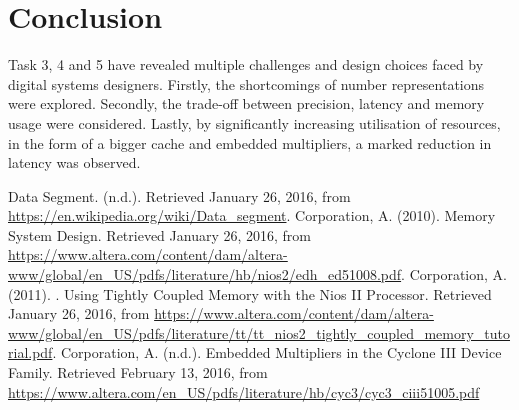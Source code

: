\documentclass{article}
\begin{document}
\section{Conclusion}
Task 3, 4 and 5 have revealed multiple challenges and design choices faced by digital systems designers. Firstly, the shortcomings of number representations were explored. Secondly, the trade-off between precision, latency and memory usage were considered. Lastly, by significantly increasing utilisation of resources, in the form of a bigger cache and embedded multipliers, a marked reduction in latency was observed. 


\newpage
\begin{thebibliography}{99}
 Data Segment. (n.d.). Retrieved January 26, 2016, from \url{https://en.wikipedia.org/wiki/Data_segment}.
 Corporation, A. (2010). Memory System Design. Retrieved January 26, 2016, from \url{https://www.altera.com/content/dam/altera-www/global/en_US/pdfs/literature/hb/nios2/edh_ed51008.pdf}.
 Corporation, A. (2011). . Using Tightly Coupled Memory with the Nios II Processor. Retrieved January 26, 2016, from \url{https://www.altera.com/content/dam/altera-www/global/en_US/pdfs/literature/tt/tt_nios2_tightly_coupled_memory_tutorial.pdf}.
Corporation, A. (n.d.). Embedded Multipliers in the Cyclone III Device Family. Retrieved February 13, 2016, from \url{https://www.altera.com/en_US/pdfs/literature/hb/cyc3/cyc3_ciii51005.pdf}

\end{thebibliography}
\end{document}
